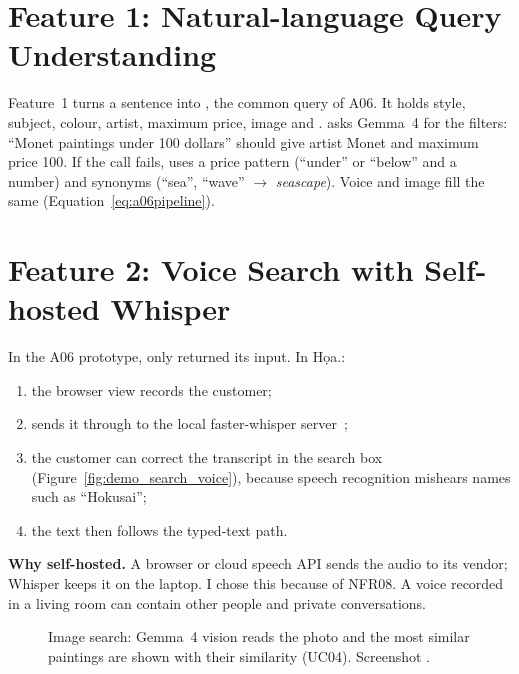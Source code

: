 \section{Feature 1: Natural-language Query Understanding}\label{sec:3.5}

Feature~1 turns a sentence into , the common query of A06. It holds style, subject, colour, artist,
maximum price, image  and .  asks Gemma~4 for the filters:
``Monet paintings under 100 dollars'' should give artist Monet and maximum price 100. If the call fails,
 uses a price pattern (``under'' or ``below'' and a number) and synonyms (``sea'', ``wave''
$\rightarrow$ \emph{seascape}). Voice and image fill the same  (Equation~\ref{eq:a06pipeline}).

\section{Feature 2: Voice Search with Self-hosted Whisper}\label{sec:3.6}

In the A06 prototype,  only returned its input. In Họa.:
\begin{enumerate}
\item the browser view  records the customer;
\item {} sends it through  to the local faster-whisper
      server~\cite{whisper,fasterwhisper};
\item the customer can correct the transcript in the search box (Figure~\ref{fig:demo_search_voice}), because speech
      recognition mishears names such as ``Hokusai'';
\item the text then follows the typed-text path.
\end{enumerate}
\textbf{Why self-hosted.} A browser or cloud speech API sends the audio to its vendor; Whisper keeps it on the laptop.
I chose this because of NFR08. A voice recorded in a living room can contain other people and private
conversations.

\begin{figure}[htbp]
\centering
\begin{minipage}[t]{0.485\linewidth}\centering
{}
\caption[Voice search with the editable transcript]{Voice search: the Whisper transcript appears in the search box, where the customer can correct it before searching (UC03). Screenshot .}\label{fig:demo_search_voice}
\end{minipage}\hfill
\begin{minipage}[t]{0.485\linewidth}\centering
{}
\caption[Image search]{Image search: Gemma~4 vision reads the photo and the most similar paintings are shown with their similarity (UC04). Screenshot .}\label{fig:demo_search_image}
\end{minipage}
\end{figure}

